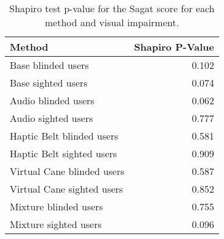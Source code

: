 
\begin{table}[!htb]
\centering
\caption{Shapiro test p-value for the Sagat score for each method and visual impairment.}
\label{tab:shapiro_sagat_score}
\begin{tabular}{lr}
\toprule
                    Method &  Shapiro P-Value \\
\midrule
        Base blinded users &            0.102 \\
        Base sighted users &            0.074 \\
       Audio blinded users &            0.062 \\
       Audio sighted users &            0.777 \\
 Haptic Belt blinded users &            0.581 \\
 Haptic Belt sighted users &            0.909 \\
Virtual Cane blinded users &            0.587 \\
Virtual Cane sighted users &            0.852 \\
     Mixture blinded users &            0.755 \\
     Mixture sighted users &            0.096 \\
\bottomrule
\end{tabular}
\end{table}

